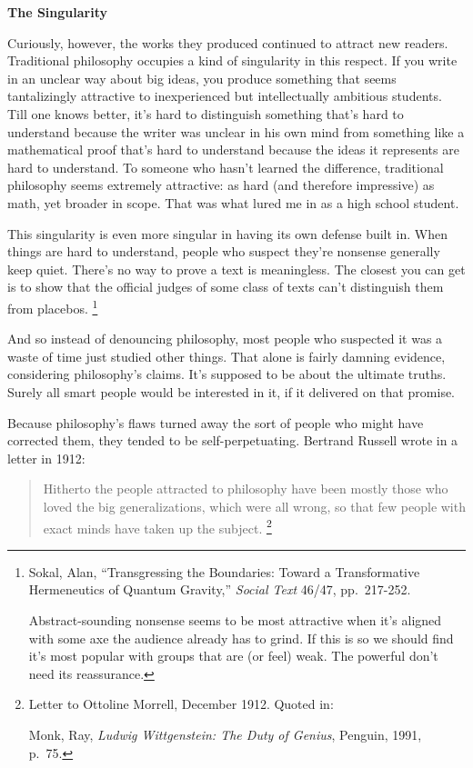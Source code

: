 \textbf{The Singularity}

Curiously, however, the works they produced continued to attract new
readers. Traditional philosophy occupies a kind of singularity in this
respect. If you write in an unclear way about big ideas, you produce
something that seems tantalizingly attractive to inexperienced but
intellectually ambitious students. Till one knows better, it's hard to
distinguish something that's hard to understand because the writer was
unclear in his own mind from something like a mathematical proof that's
hard to understand because the ideas it represents are hard to
understand. To someone who hasn't learned the difference, traditional
philosophy seems extremely attractive: as hard (and therefore
impressive) as math, yet broader in scope. That was what lured me in as
a high school student.

This singularity is even more singular in having its own defense built
in. When things are hard to understand, people who suspect they're
nonsense generally keep quiet. There's no way to prove a text is
meaningless. The closest you can get is to show that the official judges
of some class of texts can't distinguish them from placebos.
\footnote{Sokal, Alan, ``Transgressing the Boundaries: Toward a
Transformative Hermeneutics of Quantum Gravity,'' \emph{Social Text}
46/47, pp.~217-252.

Abstract-sounding nonsense seems to be most attractive when it's aligned
with some axe the audience already has to grind. If this is so we should
find it's most popular with groups that are (or feel) weak. The powerful
don't need its reassurance.}

And so instead of denouncing philosophy, most people who suspected it
was a waste of time just studied other things. That alone is fairly
damning evidence, considering philosophy's claims. It's supposed to be
about the ultimate truths. Surely all smart people would be interested
in it, if it delivered on that promise.

Because philosophy's flaws turned away the sort of people who might have
corrected them, they tended to be self-perpetuating. Bertrand Russell
wrote in a letter in 1912:

\begin{quote}
Hitherto the people attracted to philosophy have been mostly those who
loved the big generalizations, which were all wrong, so that few people
with exact minds have taken up the subject. \footnote{Letter to Ottoline Morrell, December 1912. Quoted in:

Monk, Ray, \emph{Ludwig Wittgenstein: The Duty of Genius}, Penguin,
1991, p.~75.}
\end{quote}

